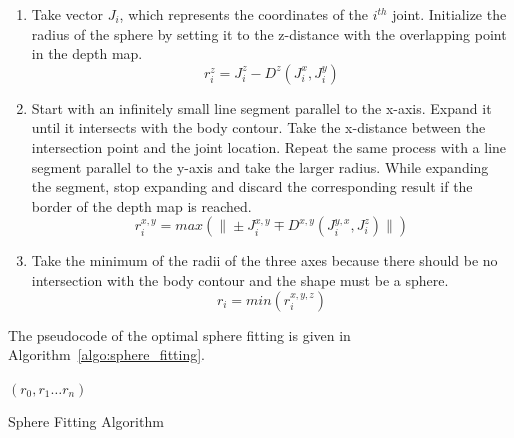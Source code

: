 \documentclass[number,preprint,review,12pt]{elsarticle}
\begin{document}
\begin{enumerate}
\item Take vector $J_i$, which represents the coordinates of the $i^{th}$ joint.
Initialize the radius of the sphere by setting it to the z-distance with the overlapping point in the depth map.
\begin{equation}
r_i^z=J_i^z-D^z(J_i^x,J_i^y)
\label{eqn:z_sphere_radius}
\end{equation}
\item Start with an infinitely small line segment parallel to the x-axis. Expand it until it intersects with the body contour. Take the x-distance between the intersection point and the joint location. Repeat the same process with a line segment parallel to the y-axis and take the larger radius. While expanding the segment, stop expanding and discard the corresponding result if the border of the depth map is reached.
\begin{equation}
r_i^{x,y}=max(\| \pm J_i^{x,y} \mp D^{x,y}(J_i^{y,x},J_i^z)\|)
\label{eqn:x_y_sphere_radius}
\end{equation}
\item Take the minimum of the radii of the three axes because there should be no intersection with the body contour and the shape must be a sphere.
\begin{equation}
r_i=min(r_i^{x,y,z})
\label{eqn:minimum_sphere-radius}
\end{equation}
\end{enumerate}

\noindent The pseudocode of the optimal sphere fitting is given in Algorithm~\ref{algo:sphere_fitting}.

\singlespacing

\begin{algorithm}
\DontPrintSemicolon 
{}
\Return $(r_0,r_1 \ldots r_n)$ 
\caption{Sphere Fitting Algorithm}
\label{algo:sphere_fitting}
\end{algorithm}  
\end{document}
